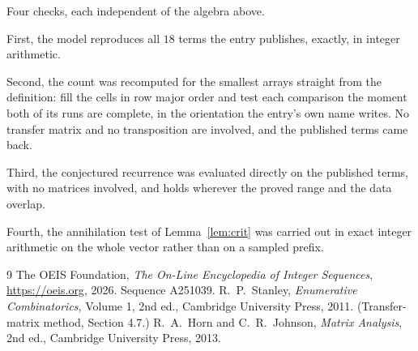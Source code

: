 \documentclass[11pt,a4paper]{article}
\theoremstyle{plain}
\theoremstyle{definition}
\begin{document}
Four checks, each independent of the algebra above.

First, the model reproduces all $18$ terms the entry publishes, exactly, in integer
arithmetic.

Second, the count was recomputed for the smallest arrays straight from the definition: fill the
cells in row major order and test each comparison the moment both of its runs are complete,
in the orientation the entry's own name writes. No transfer matrix and no transposition are
involved, and the published terms came back.

Third, the conjectured recurrence was evaluated directly on the published terms, with no
matrices involved, and holds wherever the proved range and the data overlap.

Fourth, the annihilation test of Lemma~\ref{lem:crit} was carried out in exact integer
arithmetic on the whole vector rather than on a sampled prefix.

\begin{thebibliography}{9}
 The OEIS Foundation, \emph{The On-Line Encyclopedia of Integer
Sequences}, \url{https://oeis.org}, 2026. Sequence A251039.
 R.~P.~Stanley, \emph{Enumerative Combinatorics}, Volume 1, 2nd ed.,
Cambridge University Press, 2011. (Transfer-matrix method, Section 4.7.)
 R.~A.~Horn and C.~R.~Johnson, \emph{Matrix Analysis}, 2nd ed., Cambridge
University Press, 2013.
\end{thebibliography}
\end{document}
